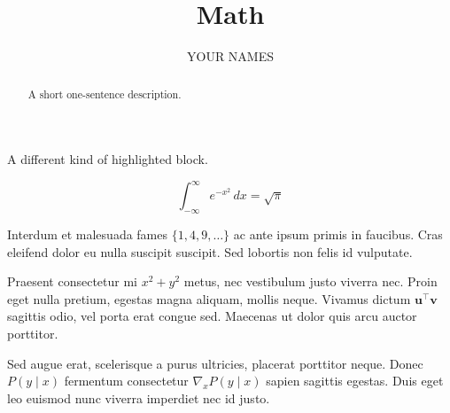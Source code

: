 \documentclass{ximera}
\author{YOUR NAMES}
\title{Math}
\begin{document}
\begin{abstract}
    A short one-sentence description.
\end{abstract}
\maketitle

A different kind of highlighted block.

$$
\int_{-\infty}^{\infty} e^{-x^2}\,dx = \sqrt{\pi}
$$

Interdum et malesuada fames $\{1, 4, 9, \ldots\}$ ac ante ipsum primis in
faucibus. Cras eleifend dolor eu nulla suscipit suscipit. Sed lobortis non
felis id vulputate.


Praesent consectetur mi $x^2 + y^2$ metus, nec vestibulum justo viverra
nec. Proin eget nulla pretium, egestas magna aliquam, mollis neque. Vivamus
dictum $\mathbf{u}^\intercal\mathbf{v}$ sagittis odio, vel porta erat
congue sed. Maecenas ut dolor quis arcu auctor porttitor.


Sed augue erat, scelerisque a purus ultricies, placerat porttitor neque.
Donec $P(y \mid x)$ fermentum consectetur $\nabla_x P(y \mid x)$ sapien
sagittis egestas. Duis eget leo euismod nunc viverra imperdiet nec id
justo.
\end{document}
